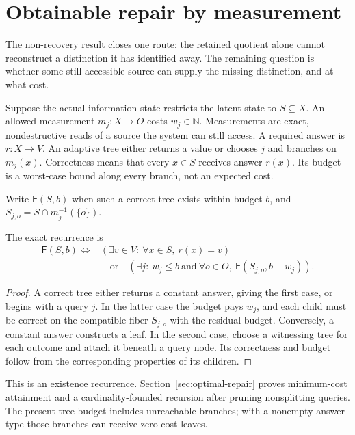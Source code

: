\section{Obtainable repair by measurement}\label{sec:obtainable-repair}

The non-recovery result closes one route: the retained quotient alone
cannot reconstruct a distinction it has identified away. The
remaining question is whether some still-accessible source can supply
the missing distinction, and at what cost.

Suppose the actual information state restricts the latent state to
$S\subseteq X$. An allowed measurement $m_j:X\to O$ costs
$w_j\in\mathbb N$. Measurements are exact, nondestructive reads of
a source the system can still access. A required answer is $r:X\to V$.
An adaptive tree either returns a value or chooses $j$ and branches on
$m_j(x)$. Correctness means that every $x\in S$ receives answer $r(x)$.
Its budget is a worst-case bound along every branch, not an expected cost.

Write $\mathsf F(S,b)$ when such a correct tree exists within budget $b$,
and $S_{j,o}=S\cap m_j^{-1}(\{o\})$.
\begin{theorem}\label{thm:repair-feasibility}
The exact recurrence is
\begin{align*}
 \mathsf F(S,b)\iff{}&
   (\exists v\in V:\ \forall x\in S,\ r(x)=v)\\
 &\quad\text{or}\quad
   (\exists j:\ w_j\le b\ \text{and}\
       \forall o\in O,\ \mathsf F(S_{j,o},b-w_j)).
\end{align*}
\end{theorem}
\begin{proof}
A correct tree either returns a constant answer, giving the first
case, or begins with a query $j$. In the latter case the budget pays
$w_j$, and each child must be correct on the compatible fiber
$S_{j,o}$ with the residual budget. Conversely, a constant answer
constructs a leaf. In the second case, choose a witnessing tree for
each outcome and attach it beneath a query node. Its correctness and
budget follow from the corresponding properties of its children.
\end{proof}
This is an existence recurrence. Section~\ref{sec:optimal-repair} proves
minimum-cost attainment and a cardinality-founded recursion after pruning
nonsplitting queries. The present tree budget includes unreachable branches;
with a nonempty answer type those branches can receive zero-cost leaves.

